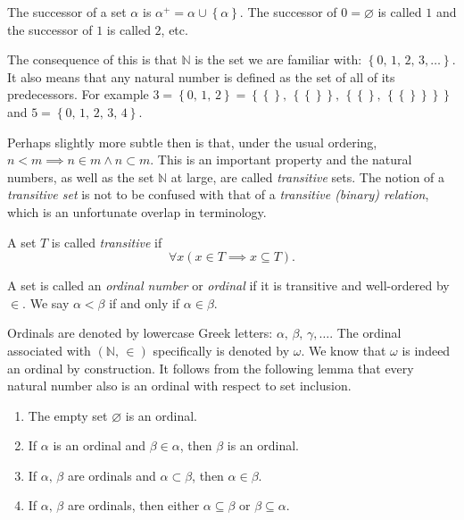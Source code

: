 \documentclass[../../main.tex]{subfiles}
\begin{document}
\begin{definition}\cite[p.38]{Gol17}
    The successor of a set $\alpha$ is $\alpha^+ = \alpha \cup \left\{\alpha\right\}$.
    The successor of $0 = \varnothing$ is called $1$ and the successor of $1$ is called $2$, etc.
\end{definition}

The consequence of this is that $\mathbb{N}$ is the set we are familiar with: $\left\{0,\, 1,\, 2,\, 3,\ldots\right\}$.
It also means that any natural number is defined as the set of all of its predecessors.
For example $3 = \left\{0,\, 1,\, 2\right\} = \left\{\left\{\right\},\, \left\{\left\{\right\}\right\},\, \left\{\left\{\right\},\, \left\{\left\{\right\}\right\}\right\}\right\}$ and $5 = \left\{0,\, 1,\, 2,\, 3,\, 4\right\}$.

Perhaps slightly more subtle then is that, under the usual ordering, $n < m \implies n \in m \wedge n \subset m$.
This is an important property and the natural numbers, as well as the set $\mathbb{N}$ at large, are called \textit{transitive} sets.
The notion of a \textit{transitive set} is not to be confused with that of a \textit{transitive (binary) relation}, which is an unfortunate overlap in terminology.

\begin{definition}\cite[p.14]{Jec78}
    A set $T$ is called \textit{transitive} if $$\forall x \left(x \in T \implies x \subseteq T\right).$$
\end{definition}

\begin{definition}\cite[p.14]{Jec78}
    A set is called an \textit{ordinal number} or \textit{ordinal} if it is transitive and well-ordered by $\in$.
    We say $\alpha < \beta$ if and only if $\alpha \in \beta$.
\end{definition}

Ordinals are denoted by lowercase Greek letters: $\alpha,\, \beta,\, \gamma,\ldots.$
The ordinal associated with $\left(\mathbb{N},\, \in\right)$ specifically is denoted by $\omega$.
We know that $\omega$ is indeed an ordinal by construction.
It follows from the following lemma that every natural number also is an ordinal with respect to set inclusion.

\begin{lemma}\cite[Lemma 2.3, p.15]{Jec78}
    \begin{enumerate}
        \item The empty set $\varnothing$ is an ordinal.
        \item If $\alpha$ is an ordinal and $\beta \in \alpha$, then $\beta$ is an ordinal.
        \item If $\alpha,\, \beta$ are ordinals and $\alpha \subset \beta$, then $\alpha \in \beta$.
        \item If $\alpha,\, \beta$ are ordinals, then either  $\alpha \subseteq \beta$ or $\beta \subseteq \alpha$.
    \end{enumerate}
\end{lemma}
\end{document}
